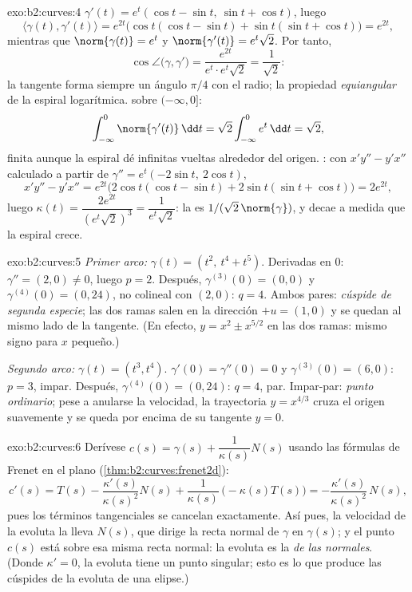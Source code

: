 \begin{solution}{exo:b2:curves:4}
$\gamma'(t) = e^t(\cos t - \sin t,\ \sin t + \cos t)$, luego
\[
\langle \gamma(t), \gamma'(t)\rangle = e^{2t}
\bigl(\cos t(\cos t - \sin t) + \sin t(\sin t + \cos t)\bigr)
= e^{2t},
\]
mientras que $\norm{\gamma(t)} = e^t$ y $\norm{\gamma'(t)} =
e^t\sqrt 2$. Por tanto,
\[
\cos\angle\bigl(\gamma, \gamma'\bigr)
= \frac{e^{2t}}{e^t \cdot e^t\sqrt2} = \frac{1}{\sqrt2} :
\]
la tangente forma siempre un ángulo $\pi/4$ con el radio; la
propiedad \emph{equiangular} de la espiral logarítmica.  sobre $(-\infty, 0]$:
\[
\int_{-\infty}^0 \norm{\gamma'(t)}\,\dd t
= \sqrt2\int_{-\infty}^0 e^t\,\dd t = \sqrt 2 ,
\]
finita aunque la espiral dé infinitas vueltas alrededor del origen.
: con $x'y'' - y'x''$ calculado a partir de $\gamma'' =
e^t(-2\sin t,\ 2\cos t)$,
\[
x'y'' - y'x'' = e^{2t}\bigl(2\cos t(\cos t - \sin t)
+ 2\sin t(\sin t + \cos t)\bigr) = 2e^{2t},
\]
luego $\kappa(t) = \dfrac{2e^{2t}}{(e^t\sqrt2)^3} =
\dfrac{1}{e^t\sqrt2}$: la  es $1/(\sqrt2\,
\norm{\gamma})$, y decae a medida que la espiral crece.
\end{solution}

\begin{solution}{exo:b2:curves:5}
\emph{Primer arco:} $\gamma(t) = (t^2,\ t^4 + t^5)$. Derivadas en
$0$: $\gamma'' = (2, 0) \neq 0$, luego $p = 2$. Después,
$\gamma^{(3)}(0) = (0, 0)$ y $\gamma^{(4)}(0) = (0, 24)$, no
colineal con $(2, 0)$: $q = 4$. Ambos pares: \emph{cúspide de segunda
especie}; las dos ramas salen en la dirección $+u = (1,0)$ y se
quedan al mismo lado de la tangente. (En efecto, $y = x^2 \pm
x^{5/2}$ en las dos ramas: mismo signo para $x$ pequeño.)

\emph{Segundo arco:} $\gamma(t) = (t^3, t^4)$. $\gamma'(0) =
\gamma''(0) = 0$ y $\gamma^{(3)}(0) = (6, 0)$: $p = 3$, impar.
Después, $\gamma^{(4)}(0) = (0, 24)$: $q = 4$, par. Impar-par:
\emph{punto ordinario}; pese a anularse la velocidad, la trayectoria
$y = x^{4/3}$ cruza el origen suavemente y se queda por encima de su
tangente $y = 0$.
\end{solution}

\begin{solution}{exo:b2:curves:6}
Derívese $c(s) = \gamma(s) + \dfrac{1}{\kappa(s)}N(s)$ usando las
fórmulas de Frenet en el plano (\cref{thm:b2:curves:frenet2d}):
\[
c'(s) = T(s) - \frac{\kappa'(s)}{\kappa(s)^2}N(s)
+ \frac{1}{\kappa(s)}\,\bigl(-\kappa(s)T(s)\bigr)
= -\frac{\kappa'(s)}{\kappa(s)^2}\,N(s) ,
\]
pues los términos tangenciales se cancelan exactamente. Así pues, la
velocidad de la evoluta la lleva $N(s)$, que dirige la recta normal
de $\gamma$ en $\gamma(s)$; y el punto $c(s)$ está sobre esa misma
recta normal: la evoluta es la \emph{ de las normales}.
(Donde $\kappa' = 0$, la evoluta tiene un punto singular; esto es lo
que produce las cúspides de la evoluta de una elipse.)
\end{solution}

